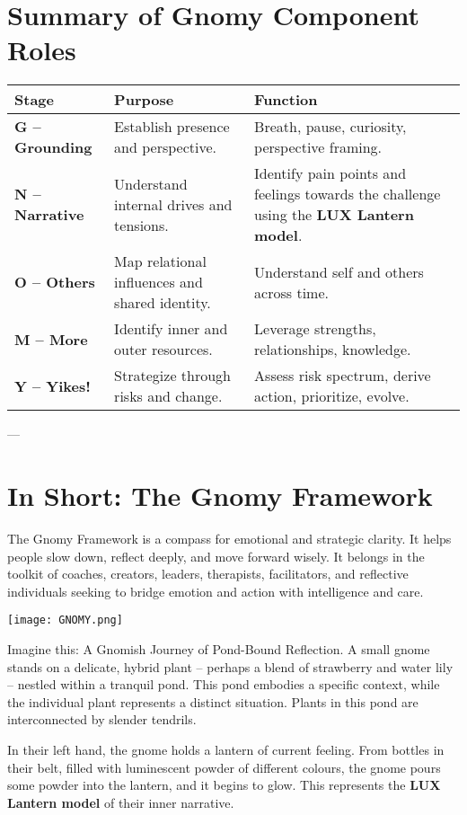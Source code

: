 \documentclass{article}
\begin{document}
\section{Summary of Gnomy Component Roles}
\begin{tabular}{|p{}|p{}|p{}|}
    \hline
    \textbf{Stage} & \textbf{Purpose} & \textbf{Function} \\
    \hline
    \textbf{G – Grounding} & Establish presence and perspective. & Breath, pause, curiosity, perspective framing. \\
    \textbf{N – Narrative} & Understand internal drives and tensions. & Identify pain points and feelings towards the challenge using the \textbf{LUX Lantern model}. \\
    \textbf{O – Others} & Map relational influences and shared identity. & Understand self and others across time. \\
    \textbf{M – More} & Identify inner and outer resources. & Leverage strengths, relationships, knowledge. \\
    \textbf{Y – Yikes!} & Strategize through risks and change. & Assess risk spectrum, derive action, prioritize, evolve. \\
    \hline
\end{tabular}

---

\section{In Short: The Gnomy Framework}
The Gnomy Framework is a compass for emotional and strategic clarity. It helps people slow down, reflect deeply, and move forward wisely. It belongs in the toolkit of coaches, creators, leaders, therapists, facilitators, and reflective individuals seeking to bridge emotion and action with intelligence and care.
\begin{center}
\texttt{[image: GNOMY.png]} %
\end{center}
Imagine this: A Gnomish Journey of Pond-Bound Reflection. A small gnome stands on a delicate, hybrid plant – perhaps a blend of strawberry and water lily – nestled within a tranquil pond. This pond embodies a specific context, while the individual plant represents a distinct situation. Plants in this pond are interconnected by slender tendrils.

In their left hand, the gnome holds a lantern of current feeling. From bottles in their belt, filled with luminescent powder of different colours, the gnome pours some powder into the lantern, and it begins to glow. This represents the \textbf{LUX Lantern model} of their inner narrative.
\end{document}
